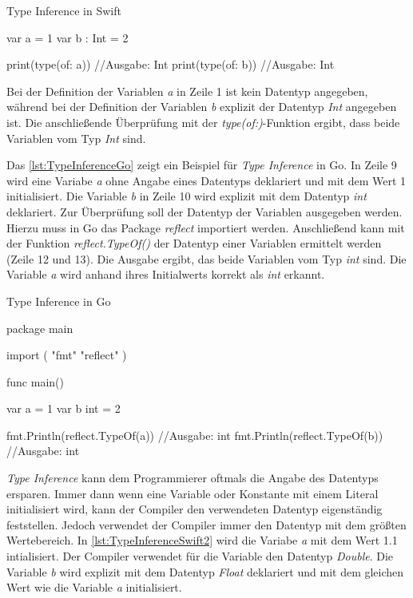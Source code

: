 \begin{listing}
\caption{Type Inference in Swift}
\label{lst:TypeInferenceSwift}
\begin{SwiftCode}
var a = 1
var b : Int = 2

print(type(of: a)) //Ausgabe: Int
print(type(of: b)) //Ausgabe: Int
\end{SwiftCode}
\end{listing}

Bei der Definition der Variablen \emph{a} in Zeile 1 ist kein Datentyp angegeben, während bei der Definition der Variablen \emph{b} explizit der Datentyp \emph{Int} angegeben ist.
Die anschließende Überprüfung mit der \emph{type(of:)}-Funktion ergibt, dass beide Variablen vom Typ \emph{Int} sind.

Das \autoref{lst:TypeInferenceGo} zeigt ein Beispiel für \emph{Type Inference} in Go. 
In Zeile 9 wird eine Variabe \emph{a} ohne Angabe eines Datentyps deklariert und mit dem Wert 1 initialisiert.
Die Variable \emph{b} in Zeile 10 wird explizit mit dem Datentyp \emph{int} deklariert.
Zur Überprüfung soll der Datentyp der Variablen ausgegeben werden. 
Hierzu muss in Go das Package \emph{reflect} importiert werden. 
Anschließend kann mit der Funktion \emph{reflect.TypeOf()} der Datentyp einer Variablen ermittelt werden (Zeile 12 und 13).
Die Ausgabe ergibt, das beide Variablen vom Typ \emph{int} sind. 
Die Variable \emph{a} wird anhand ihres Initialwerts korrekt als \emph{int} erkannt. 

\begin{listing}
\caption{Type Inference in Go }
\label{lst:TypeInferenceGo}
\begin{GoCode}
package main

import (
    "fmt"
    "reflect"
)

func main() {
    var a = 1
    var b int = 2
	
    fmt.Println(reflect.TypeOf(a)) //Ausgabe: int
    fmt.Println(reflect.TypeOf(b)) //Ausgabe: int
}
\end{GoCode}
\end{listing}

\emph{Type Inference} kann dem Programmierer oftmals die Angabe des Datentyps ersparen. 
Immer dann wenn eine Variable oder Konstante mit einem \Gls{Literal} initialisiert wird, kann der Compiler den verwendeten Datentyp eigenständig feststellen. 
Jedoch verwendet der Compiler immer den Datentyp mit dem größten Wertebereich.
In \autoref{lst:TypeInferenceSwift2} wird die Variabe \emph{a} mit dem Wert 1.1 intialisiert.
Der Compiler verwendet für die Variable den Datentyp \emph{Double}.
Die Variable \emph{b} wird explizit mit dem Datentyp \emph{Float} deklariert und mit dem gleichen Wert wie die Variable \emph{a} initialisiert.

